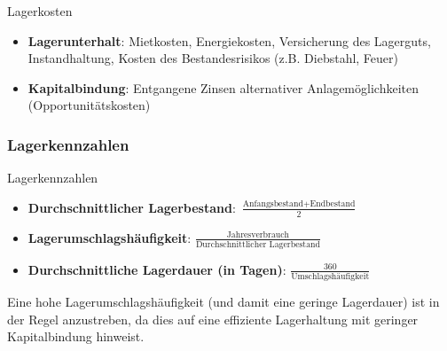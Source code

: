 \begin{definition}{Lagerkosten}
\begin{itemize}
    \item \textbf{Lagerunterhalt}: Mietkosten, Energiekosten, Versicherung des Lagerguts, Instandhaltung, Kosten des Bestandesrisikos (z.B. Diebstahl, Feuer)
    \item \textbf{Kapitalbindung}: Entgangene Zinsen alternativer Anlagemöglichkeiten (Opportunitätskosten)
\end{itemize}
\end{definition}

\subsubsection{Lagerkennzahlen}

\begin{definition}{Lagerkennzahlen}
\begin{itemize}
    \item \textbf{Durchschnittlicher Lagerbestand}: 
    $\frac{\text{Anfangsbestand} + \text{Endbestand}}{2}$
    \item \textbf{Lagerumschlagshäufigkeit}: 
    $\frac{\text{Jahresverbrauch}}{\text{Durchschnittlicher Lagerbestand}}$
    \item \textbf{Durchschnittliche Lagerdauer (in Tagen)}: 
    $\frac{360}{\text{Umschlagshäufigkeit}}$
\end{itemize}

Eine hohe Lagerumschlagshäufigkeit (und damit eine geringe Lagerdauer) ist in der Regel anzustreben, da dies auf eine effiziente Lagerhaltung mit geringer Kapitalbindung hinweist.
\end{definition}



